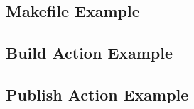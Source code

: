 \documentclass{xdpdoc}
\begin{document}
    

    \subsection{Makefile Example}

    \subsection{Build Action Example}
    

    \subsection{Publish Action Example}
    

    \printbibliography
\end{document}
